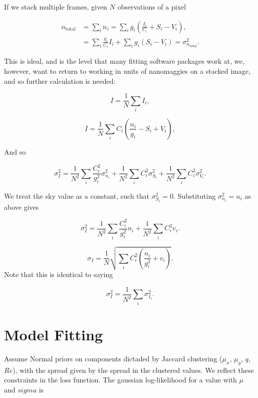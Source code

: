 \documentclass[../main.tex]{subfiles}
\begin{document}
If we stack multiple frames, given $N$ observations of a pixel

\begin{equation}
  \begin{aligned}
n_\mathrm{total} &= \sum_i{n_i} = \sum_i g_i\left(\frac{I_i}{C_i} + S_i - V_i\right),\\
                 &= \sum_{i}\frac{g_i}{C_i}I_i + \sum_i{g_i \left(S_i - V_i\right)} = \sigma_{n_\mathrm{total}}^2.
  \end{aligned}
\end{equation}

This is ideal, and is the level that many fitting software packages work at, we, however, want to return to working in units of nanomaggies on a stacked image, and so further calculation is needed:

\begin{equation}
I = \frac{1}{N}\sum_i I_i,
\end{equation}

\begin{equation}
I = \frac{1}{N}\sum_i C_i\left(\frac{n_i}{g_i} - S_i + V_i\right),
\end{equation}

And so

\begin{equation}
  \sigma_I^2 = \frac{1}{N^2}\sum_i\frac{C_i^2}{g_i^2}\sigma_{n_i}^2 + \frac{1}{N^2}\sum_i C_i^2 \sigma_{S_i}^2 + \frac{1}{N^2}\sum_i C_i^2 \sigma_{V_i}^2.
\end{equation}

We treat the sky value as a constant, such that $\sigma_{S_i}^2 = 0$. Substituting $\sigma_{n_i}^2 = n_i$ as above gives

\begin{equation}
  \sigma_I^2 = \frac{1}{N^2}\sum_i\frac{C_i^2}{g_i^2}n_i + \frac{1}{N^2}\sum_i C_i^2 v_i.
\end{equation}

\begin{equation}
  \sigma_I = \frac{1}{N}\sqrt{\sum_i C_i^2\left(\frac{n_i}{g_i^2} + v_i\right)}.
\end{equation}
Note that this is identical to saying

\begin{equation}
\sigma_I^2 = \frac{1}{N^2}\sum_i\sigma_{I_i}^2.
\end{equation}


\section{Model Fitting}
\label{sec:appendix_model_fitting}
Assume Normal priors on components dictaded by Jaccard clustering ($\mu_x$, $\mu_y$, $q$, $Re$), with the spread given by the spread in the clustered values. We reflect these constraints in the loss function. The gaussian log-likelihood for a value with $\mu$ and $sigma$ is
\end{document}
